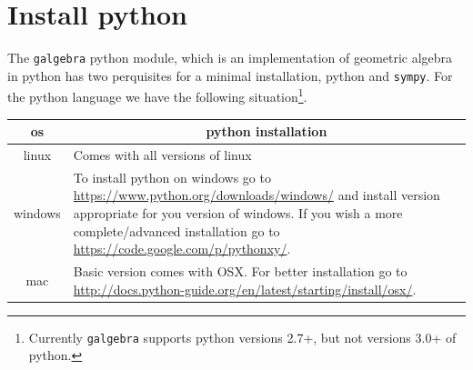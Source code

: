 \documentclass[12pt]{report}
\newcommand{\T}[1]{\texttt{#1}}
\begin{document}
\section{Install python}
The \T{galgebra} python module, which is an implementation of geometric algebra in python has two
perquisites for a minimal installation, python and \T{sympy}. For the python language we have the
following situation\footnote{Currently \T{galgebra} supports python versions 2.7+, but not versions 3.0+ of python.}.
\begin{center}
\begin{tabular}{cl}
os & \multicolumn{1}{c}{python installation} \vspace{5pt} \\ \hline
linux & \parbox{4in}{\vspace{5pt} Comes with all versions of linux\vspace{5pt}} \\ \hline
windows & \parbox{4in}{\vspace{5pt}To install python on windows go to \url{https://www.python.org/downloads/windows/} and install version
                       appropriate for you version of windows. If you wish a more complete/advanced installation go to
                       \url{https://code.google.com/p/pythonxy/}\vspace{5pt}.}\\  \hline
mac & \parbox{4in}{\vspace{5pt}Basic version comes with OSX. For better installation go to
                   \url{http://docs.python-guide.org/en/latest/starting/install/osx/}\vspace{5pt}.} \\ \hline
\end{tabular}
\end{center}
\end{document}
